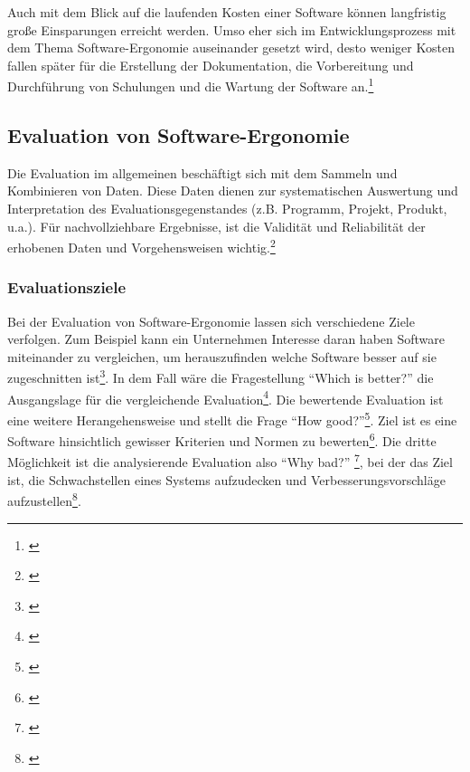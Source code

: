 Auch mit dem Blick auf die laufenden Kosten einer Software können langfristig große Einsparungen erreicht werden. Umso eher sich im Entwicklungsprozess mit dem Thema Software-Ergonomie auseinander gesetzt wird, desto weniger Kosten fallen später für die Erstellung der Dokumentation, die Vorbereitung und Durchführung von Schulungen und die Wartung der Software an.\footnote{\cite[vgl.][19]{Pruemper_Harten2007}}


\subsection{Evaluation von Software-Ergonomie}
Die Evaluation im allgemeinen beschäftigt sich mit dem Sammeln und Kombinieren von Daten. Diese Daten dienen zur systematischen Auswertung und Interpretation des Evaluationsgegenstandes (z.B. Programm, Projekt, Produkt, u.a.). Für nachvollziehbare Ergebnisse, ist die Validität und Reliabilität der erhobenen Daten und Vorgehensweisen wichtig.\footnote{\cite[vgl.][7]{Hegner2003}}


\subsubsection{Evaluationsziele}

Bei der Evaluation von Software-Ergonomie lassen sich verschiedene Ziele verfolgen. Zum Beispiel kann ein Unternehmen Interesse daran haben Software miteinander zu vergleichen, um herauszufinden welche Software besser auf sie zugeschnitten ist\footnote{\cite[vgl.][]{Gediga2002evaluation}}. In dem Fall wäre die Fragestellung \enquote{Which is better?} die Ausgangslage für die vergleichende Evaluation\footnote{\cite[vgl.][9]{Hegner2003}}. Die bewertende Evaluation ist eine weitere Herangehensweise und stellt die Frage \enquote{How good?}\footnote{\cite[vgl.][9]{Hegner2003}}. Ziel ist es eine Software hinsichtlich gewisser Kriterien und Normen zu bewerten\footnote{\cite[vgl.][]{Gediga2002evaluation}}. Die dritte Möglichkeit ist die analysierende Evaluation also \enquote{Why bad?} \footnote{\cite[vgl.][9]{Hegner2003}}, bei der das Ziel ist, die Schwachstellen eines Systems aufzudecken und Verbesserungsvorschläge aufzustellen\footnote{\cite[vgl.][]{Gediga2002evaluation}}.


